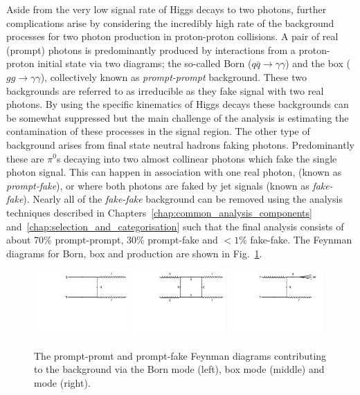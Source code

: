 Aside from the very low signal rate of Higgs decays to two photons, further complications arise by considering the incredibly high rate of the background processes for two photon production in proton-proton collisions. A pair of real (prompt) photons is predominantly produced by \QCD interactions from a proton-proton initial state via two diagrams; the so-called Born ($q\bar{q}\rightarrow\gamma\gamma$) and the box ($gg\rightarrow\gamma\gamma$), collectively known as \textit{prompt-prompt} background. These two backgrounds are referred to as irreducible as they fake signal with two real photons. By using the specific kinematics of Higgs decays these backgrounds can be somewhat suppressed but the main challenge of the analysis is estimating the contamination of these processes in the signal region. The other type of background arises from final state neutral hadrons faking photons. Predominantly these are $\pi^{0}$s decaying into two almost collinear photons which fake the single photon signal. This can happen in association with one real photon, \gjet (known as \textit{prompt-fake}), or where both photons are faked by jet signals (known as \textit{fake-fake}). Nearly all of the \textit{fake-fake} background can be removed using the analysis techniques described in Chapters~\ref{chap:common_analysis_components} and~\ref{chap:selection_and_categorisation} such that the final analysis consists of about 70\% prompt-prompt, 30\% prompt-fake and $<1\%$ fake-fake. The Feynman diagrams for Born, box and \gjet production are shown in Fig.~\ref{fig:feyn_bkgs}.

\begin{figure}
  \includegraphics[width=0.32\textwidth]{theory/plots/Born.pdf}
  \includegraphics[width=0.32\textwidth]{theory/plots/Box.pdf}
  \includegraphics[width=0.32\textwidth]{theory/plots/GJet.pdf}
  \caption[Higgs to two photon backgrounds at the \acs{LHC}]{The prompt-promt and prompt-fake Feynman diagrams contributing to the \Hgg background via the Born mode (left), box mode (middle) and \gjet mode (right).}
  \label{fig:feyn_bkgs}
\end{figure}


